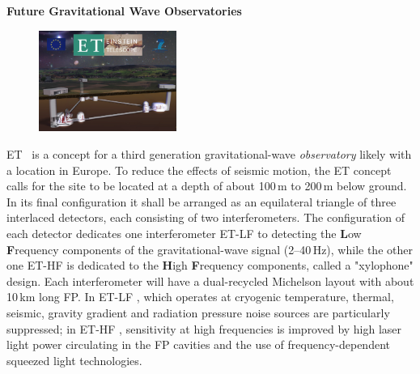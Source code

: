 \newpage

\begin{DetBox}{\bf Future Gravitational Wave Observatories}
\label{Box:GWOs}
\begin{tcolorbox}[standard jigsaw,colback=amber!10!white,colframe=red!70!black,coltext=black,size=small,  title=The Einstein gravitational--wave Telescope (ET)] 
\begin{figure}
\vspace{-10pt}
\includegraphics*[width=0.4\textwidth]{Figures/ET_Thumb.png}
\label{fig:ET_Thumb}
\vspace{-25pt}
\end{figure}
ET~\cite{ET2011} is 
 a concept for a third generation gravitational-wave \emph{observatory}
 likely with a location in Europe. 
 To reduce the effects of seismic motion, the \ac{ET} concept calls for the site to be located at a depth of about 100\,m to 200\,m below ground. In its final configuration it shall be arranged as an equilateral triangle of three interlaced detectors, each consisting of two interferometers. The configuration of each detector dedicates one interferometer \ac{ET-LF}  to detecting the \textbf{L}ow \textbf{F}requency components of the gravitational-wave signal (2--40\,Hz), while the other one \ac{ET-HF}   is dedicated to the \textbf{H}igh \textbf{F}requency components, called a "xylophone" design. Each interferometer will have a dual-recycled Michelson layout with about 10\,km long \ac{FP}. In \ac{ET-LF} , which operates at cryogenic temperature, thermal, seismic, gravity gradient and radiation pressure noise sources are particularly suppressed; in \ac{ET-HF} , sensitivity at high frequencies is improved by high laser light power circulating in the \ac{FP}  cavities and the use of frequency-dependent squeezed light technologies.
\end{tcolorbox}



\end{DetBox}
